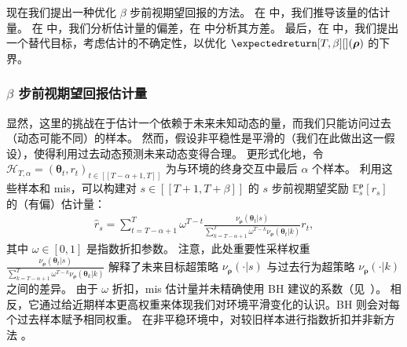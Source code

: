 现在我们提出一种优化 $\beta$ 步前视期望回报的方法。
在  中，我们推导该量的估计量。
在  中，我们分析估计量的偏差，在  中分析其方差。
最后，在  中，我们提出一个替代目标，考虑估计的不确定性，以优化 $\expectedreturn[T,\beta][](\boldsymbol\rho)$ 的下界。

\subsubsection{$\beta$ 步前视期望回报估计量}
\label{subsec:beta_step_estim}

显然，这里的挑战在于估计一个依赖于未来未知动态的量，而我们只能访问过去（动态可能不同）的样本。
然而，假设非平稳性是平滑的（我们在此做出这一假设），使得利用过去动态预测未来动态变得合理。
更形式化地，令 $\mathcal{H}_{T,\alpha} = (\boldsymbol\theta_t,r_t)_{t \in [\![T-\alpha+1,T]\!]}$ 为与环境的终身交互中最后 $\alpha$ 个样本。
利用这些样本和 \gls{mis}，可以构建对 $s \in [\![T+1,T+\beta]\!]$ 的 $s$ 步前视期望奖励 $\mathbb{E}_s^{\boldsymbol\rho}[r_s]$ 的（有偏）估计量：
\begin{align*}
    \widehat{r}_{s} = \sum_{t=T-\alpha+1}^{T} \omega^{T-t} \frac{\nu_{\boldsymbol\rho}(\boldsymbol\theta_t\vert s)}{ \sum_{k=T-\alpha+1}^T \omega^{T-k} \nu_{\boldsymbol\rho}(\boldsymbol\theta_t\vert k)} r_{t},
\end{align*}
其中 $\omega \in [0,1]$ 是指数折扣参数。
注意，此处重要性采样权重 $\textstyle\frac{\nu_{\boldsymbol\rho}(\boldsymbol\theta_t\vert s)}{ \sum_{k=T-\alpha+1}^T \omega^{T-k} \nu_{\boldsymbol\rho}(\boldsymbol\theta_k\vert k)}$ 解释了未来目标超策略 $\nu_{\boldsymbol\rho}(\cdot\vert s)$ 与过去行为超策略 $\nu_{\boldsymbol\rho}(\cdot\vert k)$ 之间的差异。
由于 $\omega$ 折扣，\gls{mis} 估计量并未精确使用 BH 建议的系数（见~）。
相反，它通过给近期样本更高权重来体现我们对环境平滑变化的认识。BH 则会对每个过去样本赋予相同权重。
在非平稳环境中，对较旧样本进行指数折扣并非新方法 \cite{jagerman2019people}。


